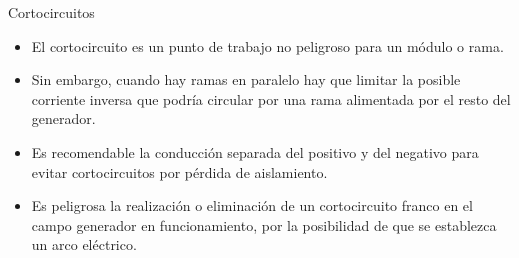 \documentclass[aspectratio=169, usenames,svgnames,dvipsnames]{beamer}
\begin{document}
\begin{frame}[label={sec:orgff3de90}]{Cortocircuitos}
\begin{itemize}
\item El \alert{cortocircuito} es un punto de trabajo \alert{no peligroso para un
módulo o rama}.

\item Sin embargo, cuando hay \alert{ramas en paralelo} hay que limitar la posible
\alert{corriente inversa} que podría circular por una rama alimentada por
el resto del generador.

\item Es recomendable la \alert{conducción separada} del positivo y del negativo
para evitar cortocircuitos por pérdida de aislamiento.

\item Es \alert{peligrosa la realización o eliminación de un cortocircuito
franco en el campo generador} en funcionamiento, por la posibilidad
de que se establezca un arco eléctrico.
\end{itemize}
\end{frame}
\end{document}
